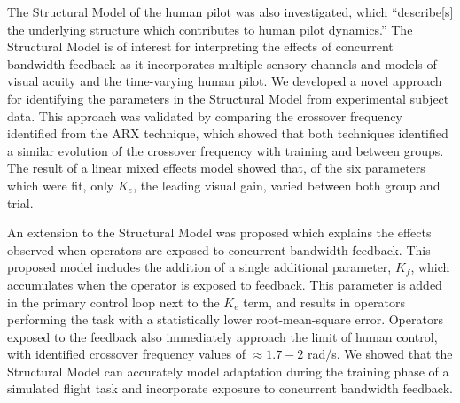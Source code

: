 The Structural Model of the human pilot was also investigated, which ``describe[s] the underlying structure which contributes to human pilot dynamics.''
The Structural Model is of interest for interpreting the effects of concurrent bandwidth feedback as it incorporates multiple sensory channels and models of visual acuity and the time-varying human pilot.
We developed a novel approach for identifying the parameters in the Structural Model from experimental subject data.
This approach was validated by comparing the crossover frequency identified from the ARX technique, which showed that both techniques identified a similar evolution of the crossover frequency with training and between groups.
The result of a linear mixed effects model showed that, of the six parameters which were fit, only $K_e$, the leading visual gain, varied between both group and trial.

An extension to the Structural Model was proposed which explains the effects observed when operators are exposed to concurrent bandwidth feedback.
This proposed model includes the addition of a single additional parameter, $K_f$, which accumulates when the operator is exposed to feedback.
This parameter is added in the primary control loop next to the $K_e$ term, and results in operators performing the task with a statistically lower root-mean-square error.
Operators exposed to the feedback also immediately approach the limit of human control, with identified crossover frequency values of $\approx 1.7-2$ rad/s.
We showed that the Structural Model can accurately model adaptation during the training phase of a simulated flight task and incorporate exposure to concurrent bandwidth feedback.
